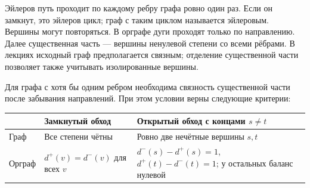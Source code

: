 \begin{definition}
Эйлеров путь проходит по каждому ребру графа ровно один раз.
Если он замкнут, это эйлеров цикл; граф с таким циклом называется эйлеровым.
Вершины могут повторяться. В орграфе дуги проходят только по направлению.
Далее существенная часть — вершины ненулевой степени со всеми рёбрами.
В лекциях исходный граф предполагается связным; отделение существенной
части позволяет также учитывать изолированные вершины.
\end{definition}
\begin{theorem}
Для графа с хотя бы одним ребром необходима связность существенной части
после забывания направлений. При этом условии верны следующие критерии:
\begin{center}
\begin{tabular}{p{.13\linewidth}|p{.34\linewidth}|p{.39\linewidth}}
 & Замкнутый обход & Открытый обход с концами \(s\ne t\)\\\hline
Граф & Все степени чётны & Ровно две нечётные вершины \(s,t\)\\[3pt]
Орграф & \(d^+(v)=d^-(v)\) для всех \(v\) &
\(d^-(s)-d^+(s)=1\), \(d^+(t)-d^-(t)=1\); у остальных баланс нулевой
\end{tabular}
\end{center}
\end{theorem}
